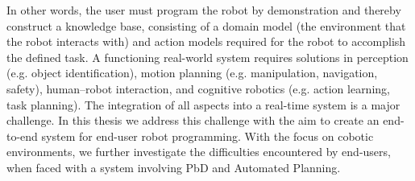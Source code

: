 In other words, the user must program the robot by demonstration and thereby construct a knowledge base, consisting of a domain model (the environment that the robot interacts with) and action models required for the robot to accomplish the defined task.
A functioning real-world system requires solutions in perception (e.g. object identification), motion planning (e.g. manipulation, navigation, safety), human–robot interaction, and cognitive robotics (e.g. action learning, task planning). 
The integration of all aspects into a real-time system is a major challenge.
In this thesis we address this challenge with the aim to create an end-to-end system for end-user robot programming.
With the focus on cobotic environments, we further investigate the difficulties encountered by end-users, when faced with a system involving PbD and Automated Planning. 

%



